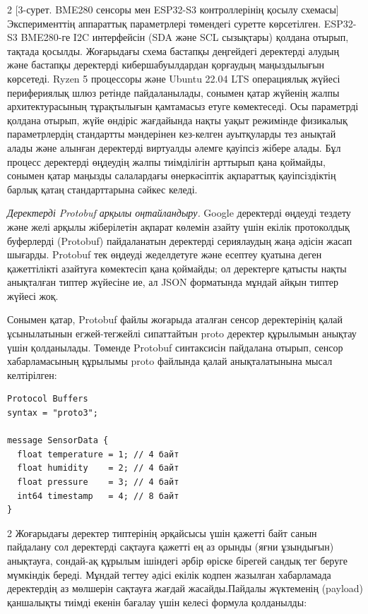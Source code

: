 \begin{multicols}{2}
[3-сурет. BME280 сенсоры мен ESP32-S3 контроллерінің қосылу
схемасы]
\vspace{-1em}
Эксперименттің аппараттық параметрлері төмендегі суретте көрсетілген.
ESP32-S3 BME280-ге I2C интерфейсін (SDA және SCL сызықтары) қолдана
отырып, тақтада қосылды. Жоғарыдағы схема бастапқы деңгейдегі деректерді
алудың және бастапқы деректерді кибершабуылдардан қорғаудың маңыздылығын
көрсетеді. Ryzen 5 процессоры және Ubuntu 22.04 LTS операциялық жүйесі
перифериялық шлюз ретінде пайдаланылады, сонымен қатар жүйенің жалпы
архитектурасының тұрақтылығын қамтамасыз етуге көмектеседі. Осы
параметрді қолдана отырып, жүйе өндіріс жағдайында нақты уақыт режимінде
физикалық параметрлердің стандартты мәндерінен кез-келген ауытқуларды
тез анықтай алады және алынған деректерді виртуалды әлемге қауіпсіз
жібере алады. Бұл процесс деректерді өңдеудің жалпы тиімділігін арттырып
қана қоймайды, сонымен қатар маңызды салалардағы өнеркәсіптік ақпараттық
қауіпсіздіктің барлық қатаң стандарттарына сәйкес келеді.

\emph{Деректерді Protobuf арқылы оңтайландыру.} Google деректерді
өңдеуді тездету және желі арқылы жіберілетін ақпарат көлемін азайту үшін
екілік протоколдық буферлерді (Protobuf) пайдаланатын деректерді
сериялаудың жаңа әдісін жасап шығарды. Protobuf тек өңдеуді жеделдетуге
және есептеу қуатына деген қажеттілікті азайтуға көмектесіп қана
қоймайды; ол деректерге қатысты нақты анықталған типтер жүйесіне ие, ал
JSON форматында мұндай айқын типтер жүйесі жоқ.

Сонымен қатар, Protobuf файлы жоғарыда аталған сенсор деректерінің қалай
ұсынылатынын егжей-тегжейлі сипаттайтын proto деректер құрылымын анықтау
үшін қолданылады. Төменде Protobuf синтаксисін пайдалана отырып, сенсор
хабарламасының құрылымы proto файлында қалай анықталатынына мысал
келтірілген:
\end{multicols}

\begin{verbatim}
Protocol Buffers
syntax = "proto3";

message SensorData {
  float temperature = 1; // 4 байт
  float humidity    = 2; // 4 байт
  float pressure    = 3; // 4 байт
  int64 timestamp   = 4; // 8 байт
}
\end{verbatim}

\begin{multicols}{2}
Жоғарыдағы деректер типтерінің әрқайсысы үшін қажетті байт санын
пайдалану сол деректерді сақтауға қажетті ең аз орынды (яғни ұзындығын)
анықтауға, сондай-ақ құрылым ішіндегі әрбір өріске бірегей сандық тег
беруге мүмкіндік береді. Мұндай тегтеу әдісі екілік кодпен жазылған
хабарламада деректердің аз мөлшерін сақтауға жағдай жасайды.Пайдалы
жүктеменің (payload) қаншалықты тиімді екенін бағалау үшін келесі
формула қолданылды:
\end{multicols}


